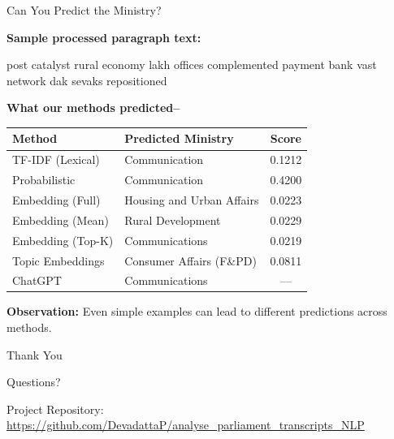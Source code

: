 \documentclass{beamer}
\begin{document}
\begin{frame}{Can You Predict the Ministry?}

\textbf{Sample processed paragraph text:}
\vspace{-0.9em}
\small
\begin{block}{}
post catalyst rural economy lakh offices complemented payment bank vast network dak sevaks repositioned
\end{block}

\textbf{What our methods predicted--}

\begin{table}[]
\centering
\small
\begin{tabular}{@{} l l c @{}}
\toprule
\textbf{Method} & \textbf{Predicted Ministry} & \textbf{Score} \\
\midrule
TF-IDF (Lexical) & Communication & 0.1212 \\
Probabilistic & Communication & 0.4200 \\
Embedding (Full) & Housing and Urban Affairs & 0.0223 \\
Embedding (Mean) & Rural Development & 0.0229 \\
Embedding (Top-K) & Communications & 0.0219 \\
Topic Embeddings & Consumer Affairs (F\&PD) & 0.0811 \\
ChatGPT & Communications & --- \\
\bottomrule
\end{tabular}
\end{table}

\textbf{Observation:} Even simple examples can lead to different predictions across methods.
\end{frame}

\begin{frame}
\centering
\Huge Thank You

\vspace{1em}

\Large Questions?

\vfill

\scriptsize Project Repository: \\ \url{https://github.com/DevadattaP/analyse_parliament_transcripts_NLP}
\end{frame}
\end{document}
